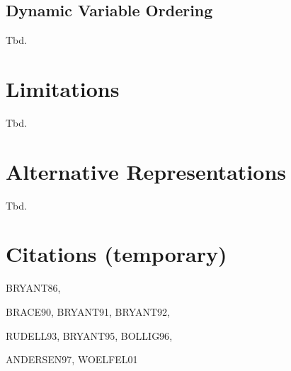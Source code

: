 \documentclass{vldb}
\begin{document}
\subsection{Dynamic Variable Ordering}
\label{subsec:dynamic-variable-ordering}

Tbd.

\section{Limitations}
\label{sec:limitations}

Tbd.

\section{Alternative Representations}
\label{sec:alternative-representations}

Tbd.

\section{Citations (temporary)}

\noindent
\par
BRYANT86\cite{BRYANT86},
\par
BRACE90\cite{BRACE90}, BRYANT91\cite{BRYANT91}, BRYANT92\cite{BRYANT92},
\par
RUDELL93\cite{RUDELL93}, BRYANT95\cite{BRYANT95}, BOLLIG96\cite{BOLLIG96},
\par
ANDERSEN97\cite{ANDERSEN97}, WOELFEL01\cite{WOELFEL01}


\balance



\end{document}
